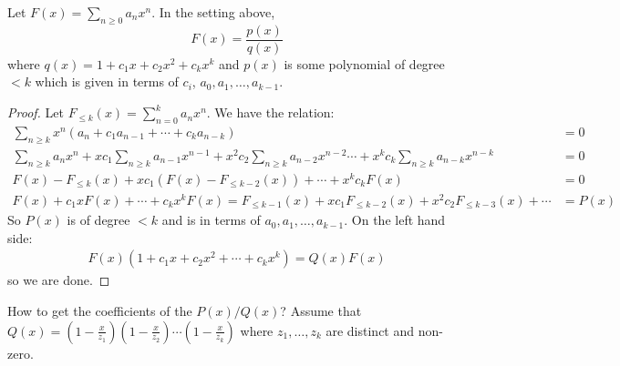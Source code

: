 \documentclass{report}
\begin{document}
\begin{theorem}{}
    Let $F(x) = \sum_{n \geq 0} a_{n}x^{n}$. In the setting above, 
        \begin{equation*}
            F(x) = \dfrac{p(x)}{q(x)}
        \end{equation*}
    where $q(x) = 1 + c_{1}x + c_{2}x^{2} + c_{k}x^{k}$ and $p(x)$ is some polynomial of degree $< k$ which is given in terms of $c_{i}$, $a_{0}, a_{1}, \ldots , a_{k - 1}$.
\end{theorem}
    \begin{proof}
        Let $F_{\leq k}(x) = \sum_{n = 0}^{k}a_{n}x^{n}$. We have the relation:
            \begin{align*}
                \sum_{n \geq k} x^{n}(a_{n} + c_{1}a_{n - 1} + \cdots + c_{k}a_{n - k}) &= 0 \\
                \sum_{n \geq k}a_{n}x^{n} + xc_{1}\sum_{n \geq k}a_{n - 1}x^{n - 1} + x^{2}c_{2} \sum_{n \geq k} a_{n - 2}x^{n - 2}\cdots + x^{k}c_{k}\sum_{n \geq k} a_{n - k}x^{n - k} &= 0 \\
                F(x) - F_{ \leq k}(x) + xc_{1}(F(x) - F_{\leq k - 2}(x)) + \cdots  + x^{k}c_{k}F(x) &= 0\\
                F(x) + c_{1}xF(x) + \cdots + c_{k}x^{k}F(x) = F_{\leq k - 1}(x) + xc_{1}F_{\leq k - 2}(x) + x^{2}c_{2} F_{\leq k - 3}(x) + \cdots  &= P(x)
            \end{align*}
        So $P(x)$ is of degree $< k$ and is in terms of $a_{0}, a_{1}, \ldots , a_{k - 1}$. On the left hand side:
            \begin{align*}
                F(x)(1 + c_{1}x + c_{2}x^{2} + \cdots + c_{k}x^{k}) = Q(x)F(x)
            \end{align*}
        so we are done.
    \end{proof}

How to get the coefficients of the $P(x)/Q(x)$? Assume that $Q(x) = (1 - \frac{x}{z_{1}})(1 - \frac{x}{z_{2}}) \cdots (1 - \frac{x}{z_{k}})$ where $z_{1}, \ldots , z_{k}$ are distinct and non-zero.
\end{document}
